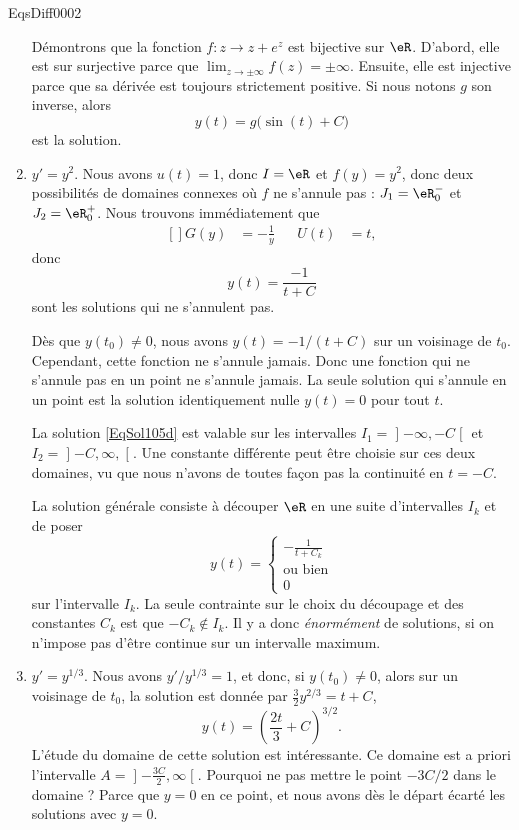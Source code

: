 \begin{corrige}{EqsDiff0002}
\begin{enumerate}
Démontrons que la fonction $f\colon z\to z+e^z$ est bijective sur $\eR$. D'abord, elle est sur surjective parce que $\lim_{z\to \pm\infty} f(z)=\pm\infty$. Ensuite, elle est injective parce que sa dérivée est toujours strictement positive. Si nous notons $g$ son inverse, alors
\begin{equation}
	y(t)=g\big( \sin(t)+C \big)
\end{equation}
est la solution.

\item
$y'=y^2$. Nous avons $u(t)=1$, donc $I=\eR$ et $f(y)=y^2$, donc deux possibilités de domaines connexes où $f$ ne s'annule pas : $J_1=\eR_0^-$ et $J_2=\eR_0^+$. Nous trouvons immédiatement que
\begin{equation}
	\begin{aligned}[]
		G(y)&=-\frac{1}{ y }&&U(t)&=t,
	\end{aligned}
\end{equation}
donc
\begin{equation}		\label{EqSol105d}
	y(t)=\frac{ -1 }{ t+C }
\end{equation}
sont les solutions qui ne s'annulent pas.

Dès que $y(t_0)\neq 0$, nous avons $y(t)=-1/(t+C)$ sur un voisinage de $t_0$. Cependant, cette fonction ne s'annule jamais. Donc une fonction qui ne s'annule pas en un point ne s'annule jamais. La seule solution qui s'annule en un point est la solution identiquement nulle $y(t)=0$ pour tout $t$.

La solution \eqref{EqSol105d} est valable sur les intervalles $I_1=\mathopen]-\infty,-C\mathclose[$ et $I_2=\mathopen]-C,\infty,\mathclose[$. Une constante différente peut être choisie sur ces deux domaines, vu que nous n'avons de toutes façon pas la continuité en $t=-C$. 

La solution générale consiste à découper $\eR$ en une suite d'intervalles $I_k$ et de poser
\begin{equation}
	y(t)=\begin{cases}
	-\frac{ 1 }{ t+C_k }	\\
	\text{ou bien}\\
	0	
\end{cases}
\end{equation}
sur l'intervalle $I_k$. La seule contrainte sur le choix du découpage et des constantes $C_k$ est que $-C_k\notin I_k$. Il y a donc \emph{énormément} de solutions, si on n'impose pas d'être continue sur un intervalle maximum.

\item
$y'=y^{1/3}$. Nous avons $y'/y^{1/3}=1$, et donc, si $y(t_0)\neq 0$, alors sur un voisinage de $t_0$, la solution est donnée par $\frac{ 3 }{ 2 }y^{2/3}=t+C$,
\begin{equation}
	y(t)=\left( \frac{ 2t }{ 3 }+C \right)^{3/2}.
\end{equation}
L'étude du domaine de cette solution est intéressante. Ce domaine est a priori l'intervalle $A=\mathopen]-\frac{ 3C }{ 2 },\infty\mathclose[$. Pourquoi ne pas mettre le point $-3C/2$ dans le domaine ? Parce que $y=0$ en ce point, et nous avons dès le départ écarté les solutions avec $y=0$. 


\end{enumerate}
\end{corrige}
